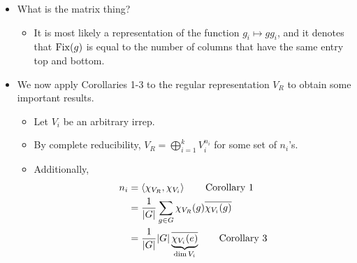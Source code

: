 \documentclass[../notes.tex]{subfiles}
\begin{document}
\begin{itemize}
    \begin{proof}
        We can compute its character $\chi_{V_R}$ by considering the corresponding permutation matrices. Indeed, the action $\chi_{V_R}(g)$ of this character on $g$ is equal to the number of 1's on the diagonal in the permuttion matrix, which is equal to the number of fixed points of the permutation, i.e., the number of $i$'s such that $gg_i=g_i$. But in a group, $gg_i=g_i$ iff $g=e$, so this number of fixed points is
        \begin{equation*}
            \chi_{V_R}(g) = \Fix(g)
            =
            \begin{pmatrix}
                g_1 & \cdots & g_n\\
                gg_1 & \cdots & gg_n\\
            \end{pmatrix}
            =
            \begin{cases}
                0 & g\neq e\\
                |G| & g=e
            \end{cases}
        \end{equation*}
        as desired.
    \end{proof}
    \item What is the matrix thing?
    \begin{itemize}
        \item It is most likely a representation of the function $g_i\mapsto gg_i$, and it denotes that $\operatorname{Fix}(g)$ is equal to the number of columns that have the same entry top and bottom.
    \end{itemize}
    \item We now apply Corollaries 1-3 to the regular representation $V_R$ to obtain some important results.
    \begin{itemize}
        \item Let $V_i$ be an arbitrary irrep.
        \item By complete reducibility, $V_R=\bigoplus_{i=1}^kV_i^{n_i}$ for some set of $n_i$'s.
        \item Additionally,
        \begin{align*}
            n_i &= \inp{\chi_{V_R},\chi_{V_i}}\tag*{Corollary 1}\\
            &= \frac{1}{|G|}\sum_{g\in G}\chi_{V_R}(g)\overline{\chi_{V_i}(g)}\\
            &= \frac{1}{|G|}|G|\underbrace{\overline{\chi_{V_i}(e)}}_{\dim V_i}\tag*{Corollary 3}\\

\end{align*}
\end{itemize}
\end{itemize}
\end{document}
